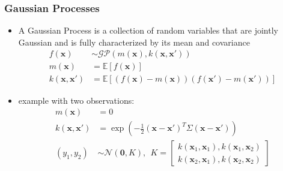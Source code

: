 \begin{frame}[t]
	
	\frametitle{Gaussian Processes}
	
		\begin{itemize}
		\item A Gaussian Process is a collection of random variables that are jointly Gaussian and is fully characterized by its mean and covariance
		\begin{align*}
		f(\mathbf{x}) & \sim \mathcal{GP} (m(\mathbf{x}), k(\mathbf{x},\mathbf{x}')) \\
		m(\mathbf{x}) & = \mathbb{E}[f(\mathbf{x})] \\
		k(\mathbf{x},\mathbf{x}') & = \mathbb{E}[(f(\mathbf{x})-m(\mathbf{x}))(f(\mathbf{x}')-m(\mathbf{x}'))]
		\end{align*}
	\end{itemize}

	\begin{itemize}
		\item example with two observations:
		\begin{align*}
		m(\mathbf{x}) & = 0 \\
		k(\mathbf{x},\mathbf{x}') & = \exp\left(-\frac{1}{2} (\mathbf{x}-\mathbf{x}')^T \Sigma (\mathbf{x}-\mathbf{x}') \right) \\
		(y_1,y_2) & \sim \mathcal{N}(\mathbf{0}, K), \ \ K=\begin{bmatrix}
		k(\mathbf{x}_1,\mathbf{x}_1), k(\mathbf{x}_1,\mathbf{x}_2) \\
		k(\mathbf{x}_2,\mathbf{x}_1), k(\mathbf{x}_2,\mathbf{x}_2)
		\end{bmatrix}
		\end{align*}
	\end{itemize}
	
\end{frame}


